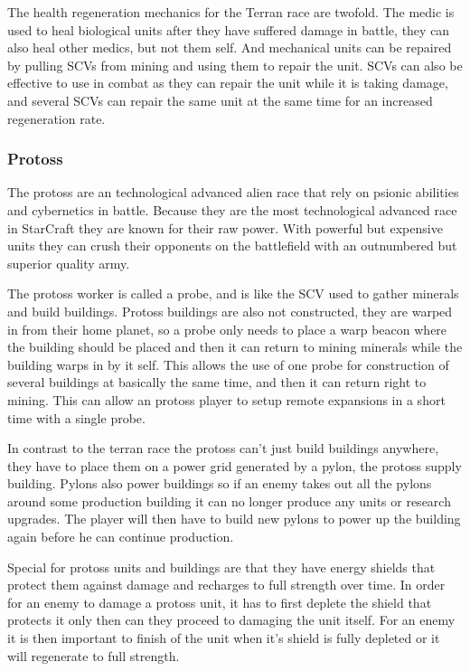 The health regeneration mechanics for the Terran race are twofold. The medic is used to heal biological units after they have suffered damage in battle, they can also heal other medics, but not them self. And mechanical units can be repaired by pulling SCVs from mining and using them to repair the unit. SCVs can also be effective to use in combat as they can repair the unit while it is taking damage, and several SCVs can repair the same unit at the same time for an increased regeneration rate. 

\subsubsection{Protoss}
The protoss are an technological advanced alien race that rely on psionic abilities and cybernetics in battle. Because they are the most technological advanced race in StarCraft they are known for their raw power. With powerful but expensive units they can crush their opponents on the battlefield with an outnumbered but superior quality army.

The protoss worker is called a probe, and is like the SCV used to gather minerals and build buildings. Protoss buildings are also not constructed, they are warped in from their home planet, so a probe only needs to place a warp beacon where the building should be placed and then it can return to mining minerals while the building warps in by it self. This allows the use of one probe for construction of several buildings at basically the same time, and then it can return right to mining. This can allow an protoss player to setup remote expansions in a short time with a single probe. 

In contrast to the terran race the protoss can't just build buildings anywhere, they have to place them on a power grid generated by a pylon, the protoss supply building. Pylons also power buildings so if an enemy takes out all the pylons around some production building it can no longer produce any units or research upgrades. The player will then have to build new pylons to power up the building again before he can continue production. 

Special for protoss units and buildings are that they have energy shields that protect them against damage and recharges to full strength over time. In order for an enemy to damage a protoss unit, it has to first deplete the shield that protects it only then can they proceed to damaging the unit itself. For an enemy it is then important to finish of the unit when it's shield is fully depleted or it will regenerate to full strength. 


